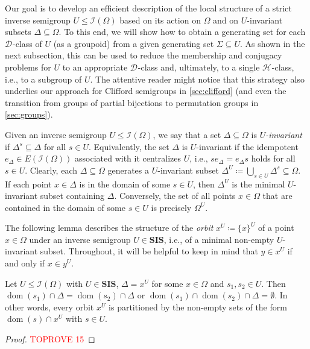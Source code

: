 \documentclass[anonymous,letter,UKenglish,cleveref,autoref,thm-restate]{lipics-v2021}
\renewcommand{\leq}{\leqslant}
\newcommand{\sse}{\subseteq}
\newcommand{\dom}{\operatorname{dom}}
\newcommand{\vSI}{\ensuremath{\mathbf{SIS}}}
\newcommand{\ISym}{\cI}
\newcommand*{\gH}[1][]{\mathrel{\mathcal{H}_{#1}}}
\newcommand*{\gD}[1][]{\mathrel{\mathcal{D}_{#1}}}
\newcommand{\cI}{\mathcal{I}}
\theoremstyle{plain}
\theoremstyle{plain}
\begin{document}
Our goal is to develop an efficient description of the local structure of a strict inverse semigroup $U \leq \ISym(\Omega)$ based on its action on $\Omega$ and on $U$-invariant subsets $\Delta \sse \Omega$.
To this end, we will show how to obtain a generating set for each $\gD$-class of $U$ (as a groupoid) from a given generating set $\Sigma \sse U$.
As shown in the next subsection, this can be used to reduce the membership and conjugacy problems for $U$ to an appropriate $\gD$-class and, ultimately, to a single $\gH$-class, i.e., to a subgroup of $U$.
The attentive reader might notice that this strategy also underlies our approach for Clifford semigroups in \cref{sec:clifford} (and even the transition from groups of partial bijections to permutation groups in \cref{sec:groups}).

Given an inverse semigroup $U \leq \ISym(\Omega)$, we say that a set $\Delta \sse \Omega$ is \emph{$U$-invariant} if $\Delta^s \sse \Delta$ for all $s \in U$.
Equivalently, the set $\Delta$ is $U$-invariant if the idempotent $e_\Delta \in E(\ISym(\Omega))$ associated with it centralizes $U$, i.e., $s e_\Delta = e_\Delta s$ holds for all $s \in U$.
Clearly, each $\Delta \sse \Omega$ generates a $U$-invariant subset $\Delta^U \coloneqq \bigcup_{s \in U} \Delta^s \sse \Omega$.
If each point $x \in \Delta$ is in the domain of some $s \in U$, then $\Delta^U$ is the minimal $U$-invariant subset containing $\Delta$.
Conversely, the set of all points $x \in \Omega$ that are contained in the domain of some $s \in U$ is precisely $\Omega^U$.

The following lemma describes the structure of the \emph{orbit} $x^U \coloneqq \{x\}^U$ of a point $x \in \Omega$ under an inverse semigroup $U \in \vSI$, i.e., of a minimal non-empty $U$-invariant subset.
Throughout, it will be helpful to keep in mind that $y \in x^U$ if and only if $x \in y^U$.

\begin{lemma}\label{lem:gb-orbits}
  Let $U \leq \ISym(\Omega)$ with $U \in \vSI$, $\Delta = x^U$ for some $x \in \Omega$ and $s_1, s_2 \in U$.
  Then $\dom(s_1) \cap \Delta = \dom(s_2) \cap \Delta$ or $\dom(s_1) \cap \dom(s_2) \cap \Delta = \emptyset$.
  In other words, every orbit $x^U$ is partitioned by the non-empty sets of the form $\dom(s) \cap x^U$ with $s \in U$.
\end{lemma}

\begin{proof}\textcolor{red}{TOPROVE 15}\end{proof}
\end{document}
